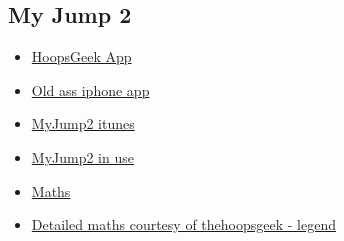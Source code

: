 \subsection{My Jump 2}
\label{research:my-jump}


\begin{itemize}
	\item \href{https://www.thehoopsgeek.com/measurement-app/#manual}{HoopsGeek App}
	\item \href{https://apps.apple.com/us/app/fitnessmeter-test-measure/id477488986}{Old ass iphone app}
	\item \href{https://apps.apple.com/gb/app/my-jump-2/id1148617550#?platform=iphone}{MyJump2 itunes}
	\item \href{https://www.youtube.com/watch?v=tIBiHDyev6w}{MyJump2 in use}
	\item \href{https://www.topendsports.com/testing/products/vertical-jump/video.htm}{Maths}
	\item \href{https://www.thehoopsgeek.com/the-physics-of-the-vertical-jump/}{Detailed maths courtesy of thehoopsgeek - legend}
\end{itemize}